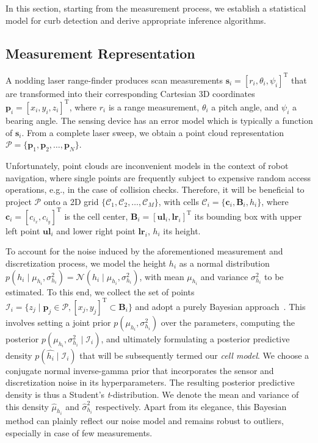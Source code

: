 In this section, starting from the measurement process, we establish a
statistical model for curb detection and derive appropriate inference
algorithms.

\subsection{Measurement Representation}

A nodding laser range-finder produces scan measurements $\mathbf{s}_i=[r_i,
\theta_i,\psi_i]^\text{T}$ that are transformed into their corresponding
Cartesian 3D coordinates $\mathbf{p}_i=[x_i,y_i,z_i]^\text{T}$, where $r_i$ is
a range measurement, $\theta_i$ a pitch angle, and $\psi_i$ a bearing angle. The
sensing device has an error model which is typically a function of
$\mathbf{s}_i$. From a complete laser sweep, we obtain a point cloud
representation $\mathcal{P}=\{\mathbf{p}_1,\mathbf{p}_2,\dots,\mathbf{p}_N\}$.

Unfortunately, point clouds are inconvenient models in the context of robot
navigation, where single points are frequently subject to expensive random
access operations, e.g., in the case of collision checks. Therefore, it will be
beneficial to project $\mathcal{P}$ onto a 2D grid
$\{\mathcal{C}_1,\mathcal{C}_2,\dots,\mathcal{C}_M\}$, with cells
$\mathcal{C}_i=\{\mathbf{c}_i,\mathbf{B}_i,h_i\}$, where
$\mathbf{c}_i=[c_{i_x},c_{i_y}]^\text{T}$ is the cell center,
$\mathbf{B}_i=[\mathbf{ul}_i, \mathbf{lr}_i]^\text{T}$ its bounding box with
upper left point $\mathbf{ul}_i$ and lower right point $\mathbf{lr}_i$, $h_i$
its height.

To account for the noise induced by the aforementioned measurement and
discretization process, we model the height $h_i$ as a normal distribution
$p(h_i\mid\mu_{h_i},\sigma^2_{h_i})=\mathcal{N}(h_i\mid\mu_{h_i},
\sigma^2_{h_i})$, with mean $\mu_{h_i}$ and variance $\sigma^2_{h_i}$ to be
estimated. To this end, we collect the set of points $\mathcal{I}_i=\{z_j\mid
\mathbf{p}_j\in\mathcal{P}, [x_j,y_j]^\text{T}\subset\mathbf{B}_i\}$ and adopt a
purely Bayesian approach~\cite{gelman03bayesian}. This involves setting a joint
prior $p(\mu_{h_i},\sigma^2_{h_i})$ over the parameters, computing the
posterior $p(\mu_{h_i},\sigma^2_{h_i}\mid\mathcal{I}_i)$, and ultimately
formulating a posterior predictive density $p(\hat{h_i}\mid\mathcal{I}_i)$ that
will be subsequently termed our \emph{cell model}. We choose a conjugate
normal inverse-gamma prior that incorporates the sensor and discretization noise
in its hyperparameters. The resulting posterior predictive density is thus a
Student's \emph{t}-distribution. We denote the mean and variance of this density
$\hat{\mu}_{h_i}$ and $\hat{\sigma}^2_{h_i}$ respectively. Apart from its
elegance, this Bayesian method can plainly reflect our noise model and remains
robust to outliers, especially in case of few measurements.

